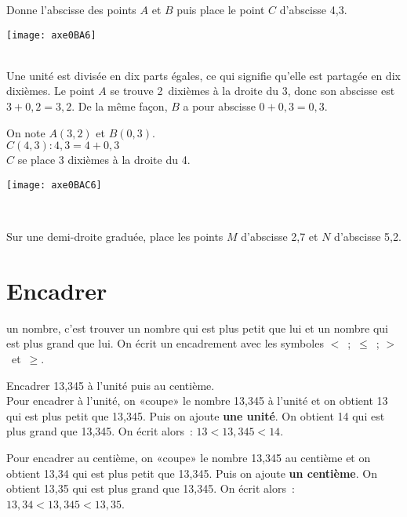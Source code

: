 \begin{exemple*1}

 \begin{minipage}[c]{.46\textwidth}
 Donne l'abscisse des points $A$ et $B$ puis place le point $C$ d'abscisse 4,3.
  \end{minipage}\hfill%
 \begin{minipage}[c]{.46\textwidth} 
\texttt{[image: axe0BA6]}
 \end{minipage}\\

Une unité est divisée en dix parts égales, ce qui signifie qu'elle est partagée en dix dixièmes. Le point $A$ se trouve 2 dixièmes à la droite du 3, donc son abscisse est $3 + 0,2 = 3,2$. De la même façon, $B$ a pour abscisse $0 + 0,3 = 0,3$. \\

  \begin{minipage}[c]{.46\textwidth}
On note $A(3,2)$ et $B(0,3)$.\\
$C(4,3) : 4,3 = 4 + 0,3$\\
$C$ se place 3 dixièmes à la droite du 4.
  \end{minipage}\hfill%
 \begin{minipage}[c]{.46\textwidth} 
\texttt{[image: axe0BAC6]}
 \end{minipage}\\

\end{exemple*1}


Sur une demi-droite graduée, place les points $M$ d'abscisse 2,7 et $N$ d'abscisse 5,2.
\section{Encadrer}

\begin{aconnaitre}
\textbf{} un nombre, c'est trouver un nombre qui est plus petit que lui et un nombre qui est plus grand que lui. On écrit un encadrement avec les symboles $<$ ; $\leqslant$ ; $>$ et $\geqslant$. 
\end{aconnaitre}

\begin{exemple*1}
Encadrer 13,345 à l'unité puis au centième.\\[1em]

Pour encadrer à l'unité, on «coupe» le nombre 13,345 à l'unité et on obtient 13 qui est plus petit  que 13,345. Puis on ajoute \textbf{une unité}. On obtient 14 qui est plus grand que 13,345. On écrit alors : $13 < 13,345 < 14$.


Pour encadrer au centième, on «coupe» le nombre 13,345 au centième et on obtient 13,34 qui est plus petit que 13,345. Puis on ajoute \textbf{un centième}. On obtient 13,35 qui est plus grand que 13,345. On écrit alors : $13,34 < 13,345 < 13,35$.
\end{exemple*1}

